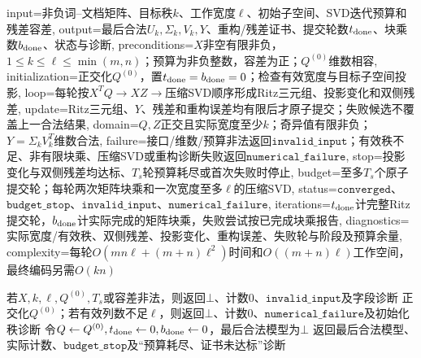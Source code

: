 \begin{AlgorithmContract}{
  input={非负词--文档矩阵、目标秩$k$、工作宽度$\ell$、初始子空间、SVD迭代预算和残差容差},
  output={最后合法$U_k,\Sigma_k,V_k,Y$、重构/残差证书、提交轮数$t_{\rm done}$、块乘数$b_{\rm done}$、状态与诊断},
  preconditions={$X$非空有限非负，$1\le k\le\ell\le\min(m,n)$；预算为非负整数，容差为正；$Q^{(0)}$维数相容},
  initialization={正交化$Q^{(0)}$，置$t_{\rm done}=b_{\rm done}=0$；检查有效宽度与目标子空间投影},
  loop={每轮按$X^TQ\to XZ\to$压缩SVD顺序形成Ritz三元组、投影变化和双侧残差},
  update={Ritz三元组、$Y$、残差和重构误差均有限后才原子提交；失败候选不覆盖上一合法结果},
  domain={$Q,Z$正交且实际宽度至少$k$；奇异值有限非负；$Y=\Sigma_kV_k^T$维数合法},
  failure={接口/维数/预算非法返回$\mathtt{invalid\_input}$；有效秩不足、非有限块乘、压缩SVD或重构诊断失败返回$\mathtt{numerical\_failure}$},
  stop={投影变化与双侧残差均达标、$T_s$轮预算耗尽或首次失败时停止},
  budget={至多$T_s$个原子提交轮；每轮两次矩阵块乘和一次宽度至多$\ell$的压缩SVD},
  status={$\mathtt{converged}$、$\mathtt{budget\_stop}$、$\mathtt{invalid\_input}$、$\mathtt{numerical\_failure}$},
  iterations={$t_{\rm done}$计完整Ritz提交轮，$b_{\rm done}$计实际完成的矩阵块乘，失败尝试按已完成块乘报告},
  diagnostics={实际宽度/有效秩、双侧残差、投影变化、重构误差、失败轮与阶段及预算余量},
  complexity={每轮$O(mn\ell+(m+n)\ell^2)$时间和$O((m+n)\ell)$工作空间，最终编码另需$O(kn)$}
}
\begin{algorithm}[tbp]
\caption{基于截断SVD的潜在语义分析}\label{alg:V4-C05-lsa}
若$X,k,\ell,Q^{(0)},T_s$或容差非法，则返回$\bot$、计数$0$、$\mathtt{invalid\_input}$及字段诊断\;
正交化$Q^{(0)}$；若有效列数不足$\ell$，则返回$\bot$、计数$0$、$\mathtt{numerical\_failure}$及初始化秩诊断\;
令$Q\leftarrow Q^{(0)},t_{\rm done}\leftarrow0,b_{\rm done}\leftarrow0$，最后合法模型为$\bot$\;
返回最后合法模型、实际计数、$\mathtt{budget\_stop}$及“预算耗尽、证书未达标”诊断\;
\end{algorithm}
\end{AlgorithmContract}

